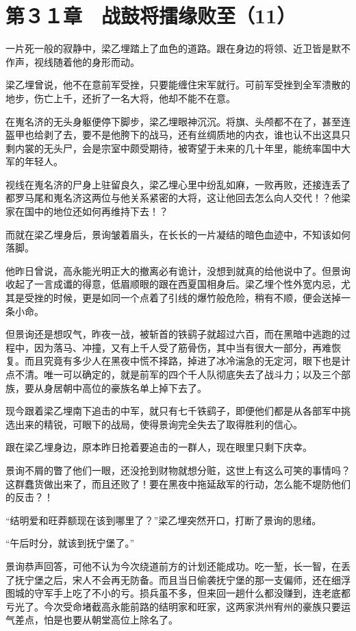 \section{第３１章　战鼓将擂缘败至（11）}

一片死一般的寂静中，梁乙埋踏上了血色的道路。跟在身边的将领、近卫皆是默不作声，视线随着他的身形而动。

梁乙埋曾说，他不在意前军受挫，只要能缠住宋军就行。可前军受挫到全军溃散的地步，伤亡上千，还折了一名大将，他却不能不在意。

在嵬名济的无头身躯便停下脚步，梁乙埋眼神沉沉。将旗、头颅都不在了，甚至连盔甲也给剥了去，要不是他胯下的战马，还有丝绸质地的内衣，谁也认不出这具只剩内裳的无头尸，会是宗室中颇受期待，被寄望于未来的几十年里，能统率国中大军的年轻人。

视线在嵬名济的尸身上驻留良久，梁乙埋心里中纷乱如麻，一败再败，还接连丢了都罗马尾和嵬名济这两位与他关系紧密的大将，这让他回去怎么向人交代！？他梁家在国中的地位还如何再维持下去！？

而就在梁乙埋身后，景询皱着眉头，在长长的一片凝结的暗色血迹中，不知该如何落脚。

他昨日曾说，高永能光明正大的撤离必有诡计，没想到就真的给他说中了。但景询收起了一言成谶的得意，低眉顺眼的跟在西夏国相身后。梁乙埋个性外宽内忌，尤其是受挫的时候，更是如同一个点着了引线的爆竹般危险，稍有不顺，便会送掉一条小命。

但景询还是想叹气，昨夜一战，被斩首的铁鹞子就超过六百，而在黑暗中逃跑的过程中，因为落马、冲撞，又有上千人受了筋骨伤，其中当有很大一部分，再难恢复。而且究竟有多少人在黑夜中慌不择路，掉进了冰冷湍急的无定河，眼下也是计点不清。唯一可以确定的，就是前军的四个千人队彻底失去了战斗力；以及三个部族，要从身居朝中高位的豪族名单上掉下去了。

现今跟着梁乙埋南下追击的中军，就只有七千铁鹞子，即便他们都是从各部军中挑选出来的精锐，可眼下的战局，使得景询完全失去了取得胜利的信心。

跟在梁乙埋身边，原本昨日抢着要追击的一群人，现在眼里只剩下庆幸。

景询不屑的瞥了他们一眼，还没抢到财物就想分赃，这世上有这么可笑的事情吗？这群蠢货做出来了，而且还败了！要在黑夜中拖延敌军的行动，怎么能不堤防他们的反击？！

“结明爱和旺莽额现在该到哪里了？”梁乙埋突然开口，打断了景询的思绪。

“午后时分，就该到抚宁堡了。”

景询恭声回答，可他不认为今次绕道前方的计划还能成功。吃一堑，长一智，在丢了抚宁堡之后，宋人不会再无防备。而且当日偷袭抚宁堡的那一支偏师，还在细浮图城的守军手上吃了不小的亏。损兵虽不多，但来回一趟什么都没赚到，连老底都亏光了。今次受命堵截高永能前路的结明家和旺家，这两家洪州宥州的豪族只要运气差点，怕是也要从朝堂高位上除名了。

